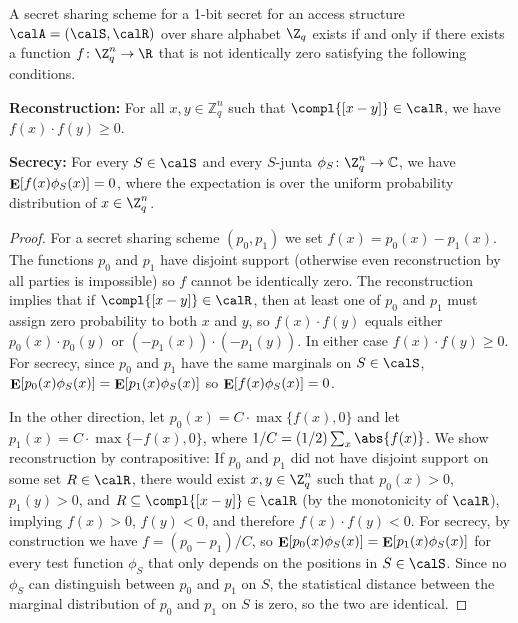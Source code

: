 \documentclass{toc}
\DeclareMathOperator\E{\mathop{\bf E}}
\begin{document}
\begin{lemma}
\label{lemma:sdp}
A secret sharing scheme for a 1-bit secret for
%
%
an access structure
$\calA=(\calS,\calR)$ over share alphabet $\Z_q$ exists if and only if 
there exists a function $f\colon \Z_q^n \to \R$ that is not 
identically zero satisfying the following 
%
conditions.    %
\begin{description}
\label{en:SDP}
\item \textbf{Reconstruction:} For all $x, y \in\mathbb{Z}_q^n$ such that
$\compl{[x - y]} \in \calR$,
we have  $f(x)\cdot f(y) \geq 0$.
\item \textbf{Secrecy:} For every $S \in \calS$ and every $S$-junta
$\phi_S\colon \Z_q^n \to \mathbb{C}$, we have  
$\E[f(x) \phi_S(x)] = 0$, where the
expectation is over the uniform probability distribution of $x\in\Z_q^n$.
\end{description}
\end{lemma}
\begin{proof}
For a secret sharing scheme $(p_0,p_1)$ 
we set $f(x) = p_0(x) - p_1(x)$.  The functions $p_0$ and $p_1$ have disjoint
support (otherwise even reconstruction by all parties is impossible) 
so $f$ cannot be identically zero.  The reconstruction implies that if $\compl{[x - y]} \in \calR$, then at least one of $p_0$ and $p_1$ must assign zero probability to both $x$ and $y$, so $f(x) \cdot f(y)$ equals either $p_0(x) \cdot p_0(y)$ or $(-p_1(x)) \cdot (-p_1(y))$.  In either case $f(x) \cdot f(y) \geq 0$.
For secrecy, since $p_0$ and $p_1$ have the same marginals on 
$S \in \calS$, $\E[p_0(x) \phi_S(x)]  = \E[p_1(x) \phi_S(x)]$ so 
$\E[f(x) \phi_S(x)] = 0$.
	
In the other direction, let $p_0(x) = C\cdot \max\{f(x), 0\}$ and let
$p_1(x) =C\cdot \max\{-f(x),\allowbreak 0\}$, where 
$1/C = (1/2) \sum_x \abs{f(x)}$. 
We show reconstruction by contrapositive: If $p_0$ and $p_1$ did not have
disjoint support on some set $R \in \calR$, there would exist $x, y \in
\Z_q^n$ such that $p_0(x) > 0$, $p_1(y) > 0$, and $R \subseteq \compl{[x -
y]} \in \calR$  (by the monotonicity of $\calR$), implying $f(x) > 0$,
$f(y) < 0$, and therefore $f(x) \cdot f(y) < 0$.
For secrecy, by construction we have 
$f = (p_0 - p_1)/C$, so $\E[p_0(x) \phi_S(x)] = \E[p_1(x) \phi_S(x)]$ 
for every test function $\phi_S$ that only depends on the positions in 
$S \in \calS$.  Since no $\phi_S$ can distinguish between $p_0$ and 
$p_1$ on $S$, the statistical distance between the marginal distribution 
of $p_0$ and $p_1$ on $S$ is zero, so the two are identical.
\end{proof}
\end{document}

